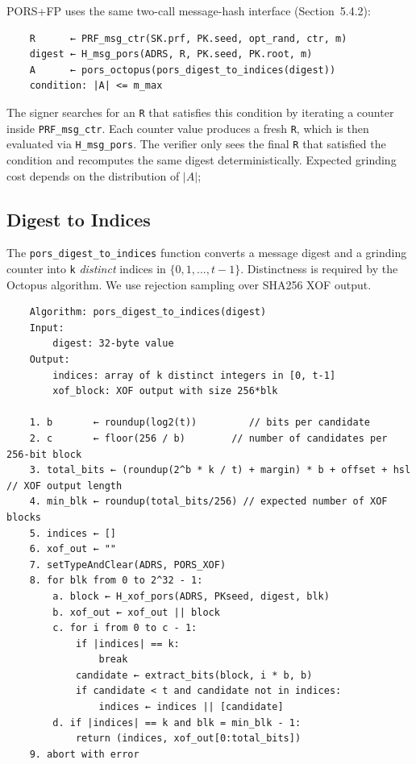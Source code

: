 PORS+FP uses the same two-call message-hash interface (Section~5.4.2):
\begin{verbatim}
    R      ← PRF_msg_ctr(SK.prf, PK.seed, opt_rand, ctr, m)
    digest ← H_msg_pors(ADRS, R, PK.seed, PK.root, m)
    A      ← pors_octopus(pors_digest_to_indices(digest))
    condition: |A| <= m_max
\end{verbatim}
 
The signer searches for an \texttt{R} that satisfies this condition by
iterating a counter inside \texttt{PRF\_msg\_ctr}. Each counter value produces
a fresh \texttt{R}, which is then evaluated via \texttt{H\_msg\_pors}. The
verifier only sees the final \texttt{R} that satisfied the condition and
recomputes the same digest deterministically. Expected grinding cost depends on the distribution of $|A|$; 

\subsection{Digest to Indices}
\label{subsec:pors_digest_to_indices}
 
The \texttt{pors\_digest\_to\_indices} function converts a message digest and a grinding
counter into \texttt{k} \emph{distinct} indices in $\{0,1,...,t-1\}$. Distinctness is required by the Octopus
algorithm. We use rejection sampling over SHA256 XOF output.
 
\begin{verbatim}
    Algorithm: pors_digest_to_indices(digest)
    Input:
        digest: 32-byte value
    Output:
        indices: array of k distinct integers in [0, t-1]
        xof_block: XOF output with size 256*blk

    1. b       ← roundup(log2(t))         // bits per candidate
    2. c       ← floor(256 / b)        // number of candidates per 256-bit block
    3. total_bits ← (roundup(2^b * k / t) + margin) * b + offset + hsl // XOF output length
    4. min_blk ← roundup(total_bits/256) // expected number of XOF blocks
    5. indices ← []
    6. xof_out ← ""
    7. setTypeAndClear(ADRS, PORS_XOF)
    8. for blk from 0 to 2^32 - 1:
        a. block ← H_xof_pors(ADRS, PKseed, digest, blk)
        b. xof_out ← xof_out || block
        c. for i from 0 to c - 1:
            if |indices| == k:
                break
            candidate ← extract_bits(block, i * b, b)
            if candidate < t and candidate not in indices:
                indices ← indices || [candidate]
        d. if |indices| == k and blk = min_blk - 1:
            return (indices, xof_out[0:total_bits])
    9. abort with error
\end{verbatim}

